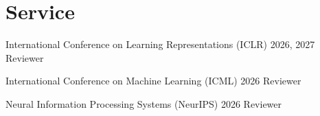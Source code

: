 \section{Service}

\begin{resumeEntries}
  \resumeEntryFull
    {International Conference on Learning Representations (ICLR) 2026, 2027}
    {Reviewer}

  \resumeEntryFull
    {International Conference on Machine Learning (ICML) 2026}
    {Reviewer}

  \resumeEntryFull
    {Neural Information Processing Systems (NeurIPS) 2026}
    {Reviewer}
\end{resumeEntries}
